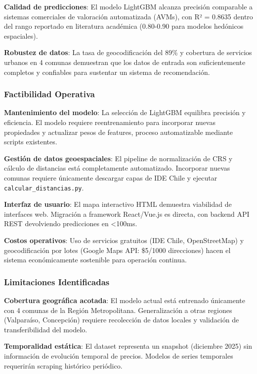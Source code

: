 \textbf{Calidad de predicciones}: El modelo LightGBM alcanza precisión comparable a sistemas comerciales de valoración automatizada (AVMs), con R² = 0.8635 dentro del rango reportado en literatura académica (0.80-0.90 para modelos hedónicos espaciales).

\textbf{Robustez de datos}: La tasa de geocodificación del 89\% y cobertura de servicios urbanos en 4 comunas demuestran que los datos de entrada son suficientemente completos y confiables para sustentar un sistema de recomendación.

\subsubsection{Factibilidad Operativa}

\textbf{Mantenimiento del modelo}: La selección de LightGBM equilibra precisión y eficiencia. El modelo requiere reentrenamiento para incorporar nuevas propiedades y actualizar pesos de features, proceso automatizable mediante scripts existentes.

\textbf{Gestión de datos geoespaciales}: El pipeline de normalización de CRS y cálculo de distancias está completamente automatizado. Incorporar nuevas comunas requiere únicamente descargar capas de IDE Chile y ejecutar \texttt{calcular\_distancias.py}.

\textbf{Interfaz de usuario}: El mapa interactivo HTML demuestra viabilidad de interfaces web. Migración a framework React/Vue.js es directa, con backend API REST devolviendo predicciones en <100ms.

\textbf{Costos operativos}: Uso de servicios gratuitos (IDE Chile, OpenStreetMap) y geocodificación por lotes (Google Maps API: \$5/1000 direcciones) hacen el sistema económicamente sostenible para operación continua.

\subsubsection{Limitaciones Identificadas}

\textbf{Cobertura geográfica acotada}: El modelo actual está entrenado únicamente con 4 comunas de la Región Metropolitana. Generalización a otras regiones (Valparaíso, Concepción) requiere recolección de datos locales y validación de transferibilidad del modelo.

\textbf{Temporalidad estática}: El dataset representa un snapshot (diciembre 2025) sin información de evolución temporal de precios. Modelos de series temporales requerirán scraping histórico periódico.

